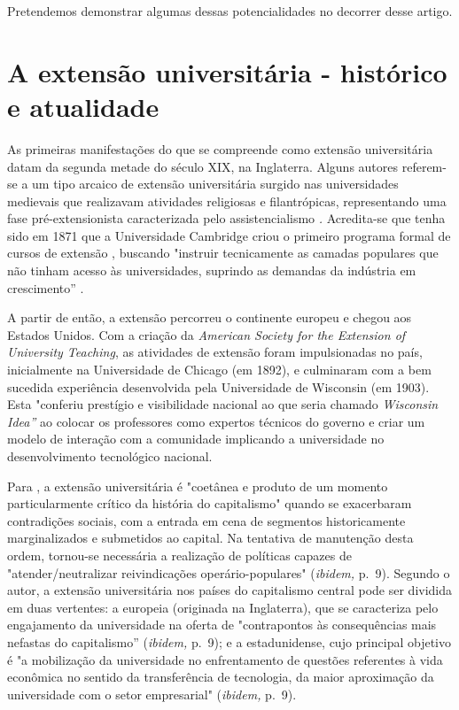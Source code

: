\documentclass[portuguese]{textolivre}
\begin{document}
Pretendemos demonstrar algumas dessas potencialidades no decorrer desse
artigo.



\section{A extensão universitária - histórico e atualidade}
As primeiras manifestações do que se compreende como extensão
universitária datam da segunda metade do século XIX, na Inglaterra.
Alguns autores referem-se a um tipo arcaico de extensão universitária
surgido nas universidades medievais que realizavam atividades religiosas
e filantrópicas, representando uma fase pré-extensionista caracterizada
pelo assistencialismo \cite{Oliveira2015}\emph{.} Acredita-se que tenha
sido em 1871 que a Universidade Cambridge criou o primeiro programa
formal de cursos de extensão \cite{Paula2013}, buscando "instruir
tecnicamente as camadas populares que não tinham acesso às
universidades, suprindo as demandas da indústria em crescimento''
\cite[p.~10]{Oliveira2015}.

A partir de então, a extensão percorreu o continente europeu e chegou
aos Estados Unidos. Com a criação da \emph{American Society for the
Extension of University Teaching}, as atividades de extensão foram
impulsionadas no país, inicialmente na Universidade de Chicago (em
1892), e culminaram com a bem sucedida experiência desenvolvida pela
Universidade de Wisconsin (em 1903). Esta "conferiu prestígio e
visibilidade nacional ao que seria chamado \emph{Wisconsin Idea''}
\cite[p.~7]{Paula2013} ao colocar os professores como expertos técnicos
do governo e criar um modelo de interação com a comunidade implicando a
universidade no desenvolvimento tecnológico nacional.

Para \textcite[p.~9]{Paula2013}, a extensão universitária é "coetânea e produto
de um momento particularmente crítico da história do capitalismo" quando
se exacerbaram contradições sociais, com a entrada em cena de segmentos
historicamente marginalizados e submetidos ao capital. Na tentativa de
manutenção desta ordem, tornou-se necessária a realização de políticas
capazes de "atender/neutralizar reivindicações operário-populares"
(\emph{ibidem, }p.~9). Segundo o autor, a extensão universitária nos
países do capitalismo central pode ser dividida em duas vertentes: a
europeia (originada na Inglaterra), que se caracteriza pelo engajamento
da universidade na oferta de "contrapontos às consequências mais
nefastas do capitalismo'' (\emph{ibidem, }p.~9); e a estadunidense, cujo
principal objetivo é "a mobilização da universidade no enfrentamento de
questões referentes à vida econômica no sentido da transferência de
tecnologia, da maior aproximação da universidade com o setor
empresarial" (\emph{ibidem, }p.~9).
\end{document}
